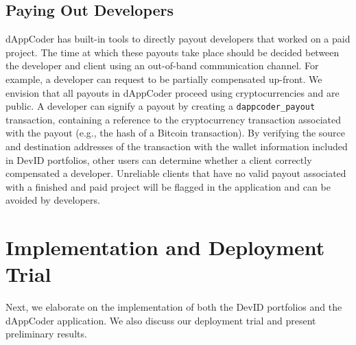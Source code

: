 


\subsection{Paying Out Developers}
\label{subsec:dappcoder_payout}
dAppCoder has built-in tools to directly payout developers that worked on a paid project.
The time at which these payouts take place should be decided between the developer and client using an out-of-band communication channel.
For example, a developer can request to be partially compensated up-front.
We envision that all payouts in dAppCoder proceed using cryptocurrencies and are public.
A developer can signify a payout by creating a \texttt{dappcoder\_payout} transaction, containing a reference to the cryptocurrency transaction associated with the payout (e.g., the hash of a Bitcoin transaction).
By verifying the source and destination addresses of the transaction with the wallet information included in DevID portfolios, other users can determine whether a client correctly compensated a developer.
Unreliable clients that have no valid payout associated with a finished and paid project will be flagged in the application and can be avoided by developers.

\section{Implementation and Deployment Trial}
\label{sec:experiments}
Next, we elaborate on the implementation of both the DevID portfolios and the dAppCoder application.
We also discuss our deployment trial and present preliminary results.

